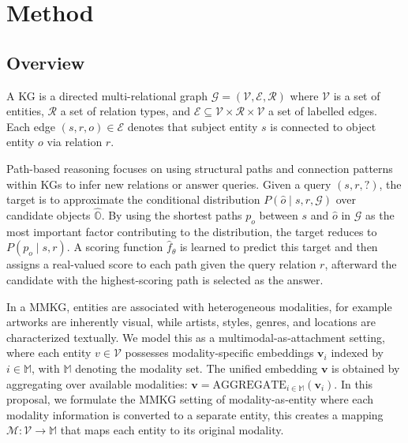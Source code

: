\documentclass[runningheads]{llncs}
\begin{document}
\section{Method}
\label{sec:method}
\subsection{Overview}
\label{sec:overview}

A KG is a directed multi-relational graph
$\mathcal{G} = (\mathcal{V}, \mathcal{E}, \mathcal{R})$ where
$\mathcal{V}$ is a set of entities, $\mathcal{R}$ a set of relation types,
and $\mathcal{E} \subseteq \mathcal{V} \times \mathcal{R} \times \mathcal{V}$
a set of labelled edges. Each edge $(s, r, o) \in \mathcal{E}$
denotes that subject entity $s$ is connected to object entity $o$
via relation $r$.

Path-based reasoning focuses on using structural paths and connection
patterns within KGs to infer new relations or answer queries. Given
a query $(s, r, ?)$, the target is to approximate the conditional
distribution $P(\hat{o} \mid s, r, \mathcal{G})$ over candidate
objects $\hat{\mathbb{O}}$. By using the shortest paths $p_o$ between $s$ and $\hat{o}$ in $\mathcal{G}$ as the most important factor contributing to the distribution,
the target reduces to $P(p_o \mid s, r)$. A scoring function
$\hat{f}_\theta$ is learned to predict this target and then assigns a real-valued score to each path given the
query relation $r$, afterward the candidate with the highest-scoring path is selected as the answer.

In a MMKG, entities are associated with heterogeneous modalities, for example artworks are inherently visual, while artists,
styles, genres, and locations are characterized textually. We model
this as a multimodal-as-attachment setting, where each entity $v \in \mathcal{V}$
possesses modality-specific embeddings $\mathbf{v}_i$ indexed by
$i \in \mathbb{M}$, with $\mathbb{M}$ denoting the modality set.
The unified embedding $\mathbf{v}$ is obtained
by aggregating over available modalities: $\mathbf{v} =
\text{AGGREGATE}_{i \in \mathbb{M}} (\mathbf{v}_i)$. In this proposal, we formulate the MMKG setting of modality-as-entity where each modality information is converted to a separate entity, this creates a mapping $\mathcal{M}: \mathcal{V} \to \mathbb{M}$ that maps each entity to its original modality.
\end{document}

